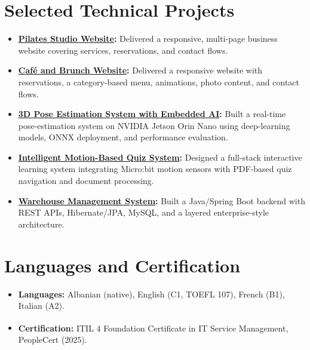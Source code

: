 \documentclass[11pt,a4paper,sans]{moderncv}
\begin{document}
\section{Selected Technical Projects}
\vspace{1pt}
\begin{itemize}
  \item \textbf{\href{https://bstudio.al}{Pilates Studio Website}:} Delivered a responsive, multi-page business website covering services, reservations, and contact flows.
  \item \textbf{\href{https://joicafe.de}{Café and Brunch Website}:} Delivered a responsive website with reservations, a category-based menu, animations, photo content, and contact flows.
  \item \textbf{\href{https://github.com/andri-10/lidar_pose_estimation}{3D Pose Estimation System with Embedded AI}:} Built a real-time pose-estimation system on NVIDIA Jetson Orin Nano using deep-learning models, ONNX deployment, and performance evaluation.
  \item \textbf{\href{https://github.com/andri-10/interactive-learning-thesis}{Intelligent Motion-Based Quiz System}:} Designed a full-stack interactive learning system integrating Micro:bit motion sensors with PDF-based quiz navigation and document processing.
  \item \textbf{\href{https://github.com/andri-10/warehouse}{Warehouse Management System}:} Built a Java/Spring Boot backend with REST APIs, Hibernate/JPA, MySQL, and a layered enterprise-style architecture.
\end{itemize}

\section{Languages and Certification}
\vspace{1pt}
\begin{itemize}
  \item \textbf{Languages:} Albanian (native), English (C1, TOEFL 107), French (B1), Italian (A2).
  \item \textbf{Certification:} ITIL\textsuperscript{\textregistered} 4 Foundation Certificate in IT Service Management, PeopleCert (2025).
\end{itemize}
\end{document}

